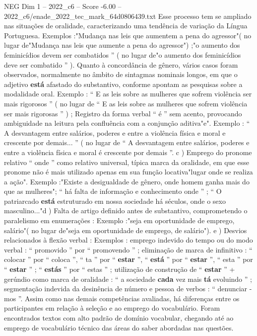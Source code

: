 \begin{textsample}{NEG Dim 1 – 2022\_c6 – Score -6.00 – 2022\_c6/enade\_2022\_tec\_mark\_64d0806439.txt}
Esse processo tem se ampliado nas situações de oralidade, caracterizando uma tendência de variação da Língua Portuguesa.
Exemplos :"Mudança nas leis que aumentem a pena do agressor"( no lugar de"Mudança nas leis que aumente a pena do agressor") ;"o aumento dos feminicídios devem ser combatidos ” ( no lugar de"o aumento dos feminicídios deve ser combatido ” ).
Quanto à concordância de gênero, vários casos foram observados, normalmente no âmbito de sintagmas nominais longos, em que o adjetivo \textbf{está} afastado do substantivo, conforme apontam as pesquisas sobre a modalidade oral.
Exemplo : “ E as leis sobre as mulheres que sofrem violência ser mais rigorosos ” ( no lugar de “ E as leis sobre as mulheres que sofrem violência ser mais rigorosas ” ) ; Registro da forma verbal “ é ” sem acento, provocando ambiguidade na leitura pela confluência com a conjunção aditiva"e".
Exemplo : “ A desvantagem entre salários, poderes e entre a violência física e moral e crescente por demais... ” ( no lugar de “ A desvantagem entre salários, poderes e entre a violência física e moral é crescente por demais ”. c ) Emprego do pronome relativo “ onde ” como relativo universal, típica marca da oralidade, em que esse pronome não é mais utilizado apenas em sua função locativa"lugar onde se realiza a ação".
Exemplo :"Existe a desigualdade de gênero, onde homem ganha mais do que as mulheres"; “ há falta de informação e conhecimento onde ” ; “ O patriarcado \textbf{está} estruturado em nossa sociedade há séculos, onde o sexo masculino..."d ) Falta de artigo definido antes de substantivo, comprometendo o paralelismo em enumerações : Exemplo :"seja em oportunidade de emprego, salário"( no lugar de"seja em oportunidade de emprego, de salário"). e ) Desvios relacionados à flexão verbal : Exemplos : emprego indevido do tempo ou do modo verbal : “ promovido ” por “ promovendo ” ; eliminação de marca de infinitivo : “ colocar ” por “ coloca ”, “ ta ” por “ \textbf{estar} ”, “ \textbf{está} ” por “ \textbf{estar} ”, “ esta ” por “ \textbf{estar} ” ; “ \textbf{estás} ” por “ estas ” ; utilização de construção de “ \textbf{estar} ” + gerúndio como marca de oralidade : “ a sociedade \textbf{cada} vez mais \textbf{tá} evoluindo ” ; segmentação indevida da desinência de número e pessoa de verbos : “ denunciar -mos ”.
Assim como nas demais competências avaliadas, há diferenças entre os participantes em relação à seleção e ao emprego do vocabulário.
Foram encontrados textos com alto padrão de domínio vocabular, chegando até ao emprego de vocabulário técnico das áreas do saber abordadas nas questões.

\end{textsample}
